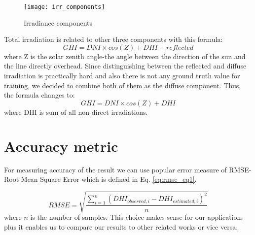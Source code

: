 \begin{figure}[h]
\caption{Irradiance components}
\label{fig:irr_comps}
\texttt{[image: irr\_components]}
\centering
\end{figure} 

Total irradiation is related to other three components with this formula:
\[ GHI = DNI \times cos (Z) + DHI + reflected \]
where Z is the solar zenith angle-the angle between the direction of the sun and the line directly overhead.
Since distinguishing between the reflected and diffuse irradiation is practically hard and also there is not any ground truth value for training, we decided to combine both of them as the diffuse component. Thus, the formula changes to:
\begin{equation}
\label{eq:irr_components}
GHI = DNI \times cos (Z) + DHI
\end{equation}
where DHI is sum of all non-direct irradiations.

\section{Accuracy metric}
For measuring accuracy of the result we can use popular error measure of RMSE-Root Mean Square Error which is defined in Eq. \ref{eq:rmse_eq1}.

\begin{equation}
\label{eq:rmse_eq1}
RMSE = \sqrt{\frac{\sum_{i=1}^{n}{(DHI_{observed, i} - DHI_{estimated ,i})^2}}{n}}
\end{equation}
where $n$ is the number of samples. This choice makes sense for our application, plus it enables us to compare our results to other related works or vice versa.

